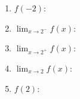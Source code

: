 \documentclass[12pt]{article}
\newcommand{\di}{\displaystyle}
\begin{document}
\begin{enumerate}
\begin{multicols}{2}
\begin{enumerate}
 \item $f(-2)$: \underline{\hspace{1in}}

\columnbreak


 \item $\di \lim_{x \to 2^-}f(x)$: \underline{\hspace{1in}}
 
 \bigskip
 
 \bigskip
 
 \item $\di \lim_{x\to 2^+}f(x)$: \underline{\hspace{1in}} 

\bigskip

\bigskip

 \item $\di \lim_{x\to 2}f(x)$: \underline{\hspace{1in}}
 
 \bigskip
 
 \bigskip
 
\item $f(2)$: \underline{\hspace{1in}}
\end{enumerate}
\end{multicols}
\end{enumerate}
\end{document}
